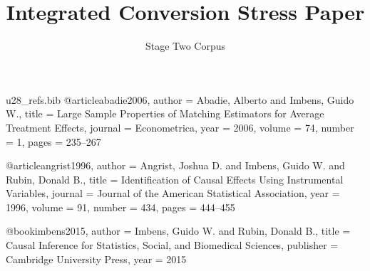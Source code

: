 \begin{filecontents*}{u28_refs.bib}
@article{abadie2006,
  author = {Abadie, Alberto and Imbens, Guido W.},
  title = {Large Sample Properties of Matching Estimators for Average Treatment Effects},
  journal = {Econometrica},
  year = {2006},
  volume = {74},
  number = {1},
  pages = {235--267}
}

@article{angrist1996,
  author = {Angrist, Joshua D. and Imbens, Guido W. and Rubin, Donald B.},
  title = {Identification of Causal Effects Using Instrumental Variables},
  journal = {Journal of the American Statistical Association},
  year = {1996},
  volume = {91},
  number = {434},
  pages = {444--455}
}

@book{imbens2015,
  author = {Imbens, Guido W. and Rubin, Donald B.},
  title = {Causal Inference for Statistics, Social, and Biomedical Sciences},
  publisher = {Cambridge University Press},
  year = {2015}
}
\end{filecontents*}

\documentclass[10pt]{article}
\usepackage[margin=0.82in]{geometry}
\usepackage[T1]{fontenc}
\usepackage{lmodern}
\usepackage{amsmath}
\usepackage{amsthm}
\usepackage{array}
\usepackage{booktabs}
\usepackage{tabularx}
\usepackage{graphicx}
\usepackage{subcaption}
\usepackage{tikz}
\usetikzlibrary{arrows.meta,calc,positioning,shapes.geometric}
\usepackage[round,authoryear]{natbib}
\usepackage[colorlinks=true,linkcolor=blue,citecolor=blue,urlcolor=blue]{hyperref}
\usepackage[nameinlink,noabbrev]{cleveref}

\newtheorem{theorem}{Theorem}

\title{Integrated Conversion Stress Paper}
\author{Stage Two Corpus}
\date{}


\maketitle

\begin{abstract}
This paper combines common scholarly structures that frequently appear together in applied research manuscripts. The example includes linked floats, mathematical displays, theorem statements, footnotes, author-year citation commands rendered through \texttt{natbib}, and an appendix. The substantive topic is a small observational evaluation in which site-level decisions are summarized through tables and diagrams. The fixture is dense by design, because conversion failures often arise when otherwise ordinary features interact in the same document.
\end{abstract}

